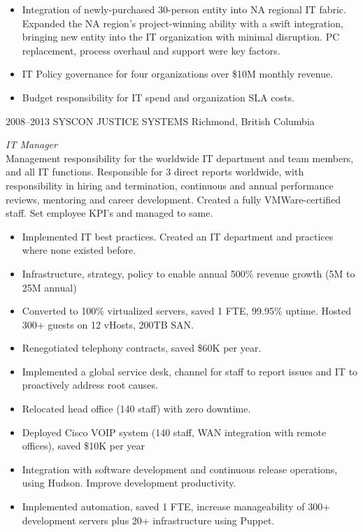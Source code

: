 \documentclass[]{friggeri-cv} %
\begin{document}
\begin{entrylist}
{\begin{itemize}
\item Integration of newly-purchased 30-person entity into NA regional IT fabric. Expanded the NA region's project-winning ability with a swift integration, bringing new entity into the IT organization with minimal disruption. PC replacement, process overhaul and support were key factors.
\item IT Policy governance for four organizations over \$10M monthly revenue.
\item Budget responsibility for IT spend and organization SLA costs.
\end{itemize}}
\entry
{2008--2013}
{SYSCON JUSTICE SYSTEMS}
{Richmond, British Columbia}
{\emph{IT Manager} \\
Management responsibility for the worldwide IT department and team members, and all IT functions. Responsible for 3 direct reports worldwide, with responsibility in hiring and termination, continuous and annual performance reviews, mentoring and career development. Created a fully VMWare-certified staff. Set employee KPI's and managed to same.  \\
\begin{itemize}
\item Implemented IT best practices. Created an IT department and practices where none existed before.
\item Infrastructure, strategy, policy to enable annual 500\% revenue growth (5M to 25M annual)
\item Converted to 100\% virtualized servers, saved 1 FTE, 99.95\% uptime. Hosted 300+ guests on 12 vHosts, 200TB SAN.
\item Renegotiated telephony contracts, saved \$60K per year.
\item Implemented a global service desk, channel for staff to report issues and IT to proactively address root causes.
\item Relocated head office (140 staff) with zero downtime.
\item Deployed Cisco VOIP system (140 staff, WAN integration with remote offices), saved \$10K per year
\item Integration with software development and continuous release operations, using Hudson. Improve development productivity.
\item Implemented automation, saved 1 FTE, increase manageability of 300+ development servers plus 20+ infrastructure using Puppet.
\end{itemize}}

\end{entrylist}
\end{document}
